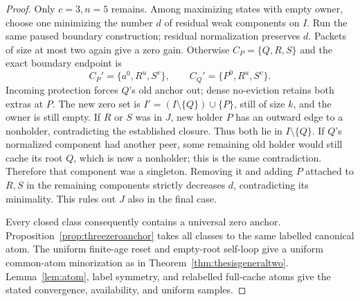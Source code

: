 \documentclass[11pt]{article}
\begin{document}
\begin{proof}
Only $c=3,n=5$ remains. Among maximizing states with
empty owner, choose one minimizing the number $d$ of
residual weak components on $I$. Run the same paused
boundary construction; residual normalization preserves $d$.
Packets of size at most two again give a zero gain.
Otherwise $C_P=\{Q,R,S\}$ and the exact boundary endpoint is
\[
 C_P'=\{a^0,R^u,S^v\},\qquad
 C_Q'=\{P^0,R^u,S^v\}.
\]
Incoming protection forces $Q$'s old anchor out; dense
no-eviction retains both extras at $P$. The new zero set
is $I'=(I\setminus\{Q\})\cup\{P\}$, still of size $k$,
and the owner is still empty.
If $R$ or $S$ was in $J$, new holder $P$ has an outward
edge to a nonholder, contradicting the established closure.
Thus both lie in $I\setminus\{Q\}$.
If $Q$'s normalized component had another peer, some
remaining old holder would still cache its root $Q$,
which is now a nonholder; this is the same contradiction.
Therefore that component was a singleton.
Removing it and adding $P$ attached to $R,S$ in the
remaining components strictly decreases $d$, contradicting
its minimality. This rules out $J$ also in the final case.

Every closed class consequently contains a universal zero
anchor. Proposition~\ref{prop:threezeroanchor} takes all
classes to the same labelled canonical atom.
The uniform finite-age reset and empty-root self-loop
give a uniform common-atom minorization as in
Theorem~\ref{thm:thesisgeneraltwo}.
Lemma~\ref{lem:atom}, label symmetry, and relabelled full-cache
atoms give the stated convergence, availability, and uniform samples.
\end{proof}
\end{document}
